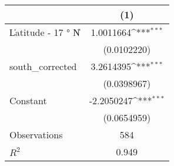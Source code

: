 {
\def\sym#1{\ifmmode^{#1}\else\(^{#1}\)\fi}
\begin{tabular}{l*{1}{c}}
\toprule
                    &\multicolumn{1}{c}{(1)}         \\
\midrule
\|Latitude - 17 $°$ N\|&   1.0011664\sym{***}\\
                    & (0.0102220)         \\
\addlinespace
south\_corrected     &   3.2614395\sym{***}\\
                    & (0.0398967)         \\
\addlinespace
Constant            &  -2.2050247\sym{***}\\
                    & (0.0654959)         \\
\midrule
Observations        &         584         \\
\(R^{2}\)           &       0.949         \\
\bottomrule
\end{tabular}
}
